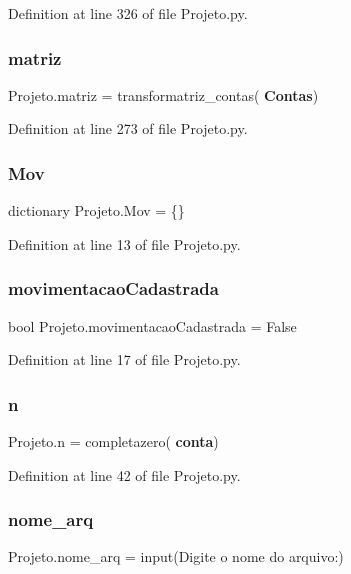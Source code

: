 Definition at line 326 of file Projeto.\+py.

\mbox{\label{namespace_projeto_a3de00514a36b88dfaaa871de9b79b917}} 
\subsubsection{matriz}
{\footnotesize\ttfamily Projeto.\+matriz = transformatriz\+\_\+contas(\textbf{ Contas})}



Definition at line 273 of file Projeto.\+py.

\mbox{\label{namespace_projeto_a3071c979119cd663eb8c5ec8bc5d9a0c}} 
\subsubsection{Mov}
{\footnotesize\ttfamily dictionary Projeto.\+Mov = \{\}}



Definition at line 13 of file Projeto.\+py.

\mbox{\label{namespace_projeto_ac5b443320d191b9d30ad99f83dca7669}} 
\subsubsection{movimentacaoCadastrada}
{\footnotesize\ttfamily bool Projeto.\+movimentacao\+Cadastrada = False}



Definition at line 17 of file Projeto.\+py.

\mbox{\label{namespace_projeto_a8a986490f4bf52948788cd46131601e5}} 
\subsubsection{n}
{\footnotesize\ttfamily Projeto.\+n = completazero(\textbf{ conta})}



Definition at line 42 of file Projeto.\+py.

\mbox{\label{namespace_projeto_aa2d486f2f3ac29af3b386dcdaf510a32}} 
\subsubsection{nome\_arq}
{\footnotesize\ttfamily Projeto.\+nome\+\_\+arq = input(\textquotesingle{}Digite o nome do arquivo\+:\textquotesingle{})}



